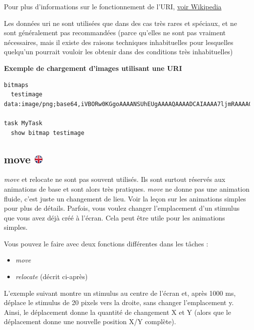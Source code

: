 \documentclass[
]{book}
\providecommand{\tightlist}{%
  \setlength{\itemsep}{0pt}\setlength{\parskip}{0pt}}
\begin{document}
Pour plus d'informations sur le fonctionnement de l'URI, \href{http://en.wikipedia.org/wiki/Data_URI_scheme}{voir Wikipedia}

Les données uri ne sont utilisées que dans des cas très rares et spéciaux, et ne sont généralement pas recommandées (parce qu'elles ne sont pas vraiment nécessaires, mais il existe des raisons techniques inhabituelles pour lesquelles quelqu'un pourrait vouloir les obtenir dans des conditions très inhabituelles)

\textbf{Exemple de chargement d'images utilisant une URI}

\begin{verbatim}
bitmaps
  testimage data:image/png;base64,iVBORw0KGgoAAAANSUhEUgAAAAQAAAADCAIAAAA7ljmRAAAAGElEQVQIW2P4DwcMDAxAfBvMAhEQMYgcACEHG8ELxtbPAAAAAElFTkSuQmCC

task MyTask
  show bitmap testimage
\end{verbatim}

\hypertarget{move}{%
\subsection[move ]{\texorpdfstring{move \href{https://www.psytoolkit.org/doc3.2.0/syntax.html\#move}{\protect\includegraphics{img/ukflag.png}}}{move }}\label{move}}

\emph{move} et relocate ne sont pas souvent utilisés. Ils sont surtout réservés aux animations de base et sont alors très pratiques.
\emph{move} ne donne pas une animation fluide, c'est juste un changement de lieu. Voir la leçon sur les animations simples pour plus de détails.
Parfois, vous voulez changer l'emplacement d'un stimulus que vous avez déjà créé à l'écran. Cela peut être utile pour les animations simples.

Vous pouvez le faire avec deux fonctions différentes dans les tâches :

\begin{itemize}
\tightlist
\item
  \emph{move}
\item
  \emph{relocate} (décrit ci-après)
\end{itemize}

L'exemple suivant montre un stimulus au centre de l'écran et, après 1000 ms, déplace le stimulus de 20 pixels vers la droite, sans changer l'emplacement y. Ainsi, le déplacement donne la quantité de changement X et Y (alors que le déplacement donne une nouvelle position X/Y complète).
\end{document}
